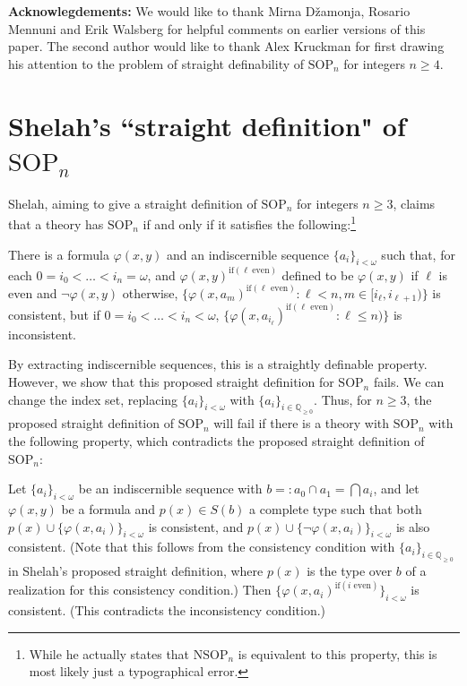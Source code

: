 \documentclass[10pt,a4paper]{amsart}
\begin{document}
\textbf{Acknowlegdements:} We would like to thank Mirna Džamonja, Rosario Mennuni and Erik Walsberg for helpful comments on earlier versions of this paper. The second author would like to thank Alex Kruckman for first drawing his attention to the problem of straight definability of $\mathrm{SOP}_n$ for integers $n \geq 4$. %


\appendix

\section{Shelah's ``straight definition" of $\mathrm{SOP}_{n}$}\label{shelah ``straight definition"}

 Shelah, aiming to give a straight definition of $\mathrm{SOP}_{n}$ for integers $n \geq 3$, claims that a theory has $\mathrm{SOP}_{n}$ if and only if it satisfies the following:\footnote{While he actually states that $\mathrm{NSOP}_{n}$ is equivalent to this property, this is most likely just a typographical error.}

    There is a formula $\varphi(x, y)$ and an indiscernible sequence $\{a_{i}\}_{i < \omega}$ such that, for each $0=i_{0} < \ldots < i_{n} = \omega$, and $\varphi(x, y)^{\mathrm{if}(\mathrm{\ell \: even})}$ defined to be $\varphi(x, y)$ if $\ell$ is even and $\neg\varphi(x, y)$ otherwise, $\{\varphi(x, a_m)^{\text{if}(\ell\text{ even})} : \ell < n, m \in [i_\ell,i_{\ell+1})\}$ is consistent, but if $0=i_{0} < \ldots < i_{n} < \omega$, $\{\varphi(x, a_{i_\ell})^{\text{if}(\ell\text{ even})} : \ell \leq n)\}$ is inconsistent.


    By extracting indiscernible sequences, this is a straightly definable property. However, we show that this proposed straight definition for $\mathrm{SOP}_{n}$ fails. We can change the index set, replacing $\{a_{i}\}_{i < \omega}$ with $\{a_{i}\}_{i \in \mathbb{Q}_{\geq 0}}$. Thus, for $n \geq 3$, the proposed straight definition of $\mathrm{SOP}_{n}$ will fail if there is a theory with $\mathrm{SOP}_{n}$ with the following property, which contradicts the proposed straight definition of $\mathrm{SOP}_{n}$:

    Let $\{a_{i}\}_{i < \omega}$ be an indiscernible sequence with $b =: a_{0} \cap a_{1} = \bigcap a_{i}$, and let $\varphi(x, y)$ be a formula and $p(x) \in S(b)$ a complete type such that both $p(x) \cup \{\varphi(x, a_{i})\}_{ i < \omega}$ is consistent, and $p(x) \cup \{\neg\varphi(x, a_{i})\}_{ i < \omega}$ is also consistent. (Note that this follows from the consistency condition with $\{a_{i}\}_{i \in \mathbb{Q}_{\geq 0}}$ in Shelah's proposed straight definition, where $p(x)$ is the type over $b$ of a realization for this consistency condition.) Then $\{\varphi(x, a_{i})^{\text{if}(i \text{ even})} \}_{ i < \omega}$ is consistent. (This contradicts the inconsistency condition.)
\end{document}
